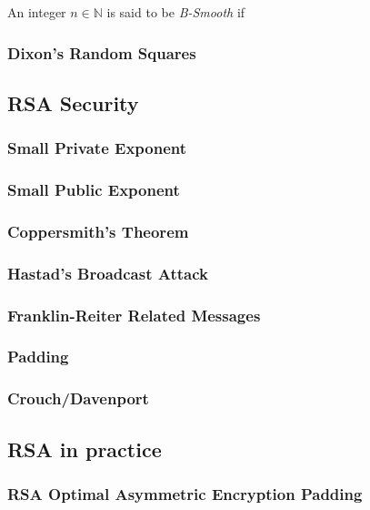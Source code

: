 \begin{definition}
    An integer $n \in \mathbb{N}$ is said to be \textit{B-Smooth} if
\end{definition}

\begin{example}
\end{example}
\subsubsection{Dixon’s Random Squares}

\subsection{RSA Security}
\subsubsection{Small Private Exponent}
\subsubsection{Small Public Exponent}
\subsubsection{Coppersmith’s Theorem}
\subsubsection{Hastad’s Broadcast Attack}
\subsubsection{Franklin-Reiter Related Messages}
\subsubsection{Padding}
\subsubsection{Crouch/Davenport}

\subsection{RSA in practice}
\subsubsection{RSA Optimal Asymmetric Encryption Padding}


